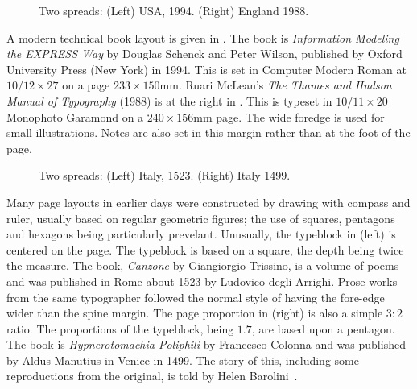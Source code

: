 \documentclass[10pt,letterpaper]{memoir}
\newcommand{\foredge}{foredge}
\newlength{\pwlayi}\setlength{\pwlayi}{0.45\textwidth} %
\newlength{\pwlayii}\setlength{\pwlayii}{0.45\pwlayi}
\begin{document}
\begin{figure}
\centering
\begin{minipage}[b]{\pwlayi}
\end{minipage}
\hfill
\begin{minipage}[b]{\pwlayi}
\end{minipage}
\caption[Two spreads: USA, 1994 and England, 1988]%
        {Two spreads: (Left) USA, 1994.
         (Right) England 1988.} \label{fb:7}
\end{figure}

    A modern technical book layout is given in . The book
is \textit{Information Modeling the EXPRESS Way} by Douglas Schenck and Peter
Wilson, published by Oxford University Press (New York) in 1994. This is
set in Computer Modern Roman at $10/12 \times 27$ on a page 
$233 \times 150$mm. Ruari McLean's \textit{The Thames and Hudson Manual of
Typography} (1988) is at the right in . This is typeset in
$10/11 \times 20$ Monophoto Garamond on a $240 \times 156$mm page. The wide
\foredge{} is used for small illustrations. Notes are also set in this
margin rather than at the foot of the page.



\begin{figure}
\centering
\begin{minipage}[b]{\pwlayi}
\end{minipage}
\hfill
\begin{minipage}[b]{\pwlayi}
\end{minipage}
\caption[Two spreads: Italy, 1523 and 1499]%
        {Two spreads: (Left) Italy, 1523.
         (Right) Italy 1499.} \label{fb:8}
\end{figure}

 Many page layouts in earlier days were constructed by
drawing with compass and ruler, usually based on regular geometric figures; 
the use of squares, pentagons and hexagons being particularly
prevelant.
    Unusually, the typeblock in  (left) is centered on the page.
The typeblock is based on a square, the depth being twice the measure.
The book, \textit{Canzone} by Giangiorgio Trissino, is a volume of poems
and was published in Rome about 1523 by Ludovico degli Arrighi. Prose works
from the same typographer followed the normal style of having the fore-edge
wider than the spine margin.
    The page proportion in  (right) is also a simple $3 : 2$ 
ratio. The proportions of the typeblock, being $1.7$, are based upon 
a pentagon.
The book is \textit{Hypnerotomachia Poliphili} by Francesco Colonna and was
published by Aldus Manutius in Venice in 1499. The story of this,
including some reproductions from the original, is told by Helen
Barolini~\cite{BAROLINI92}.
\end{document}
